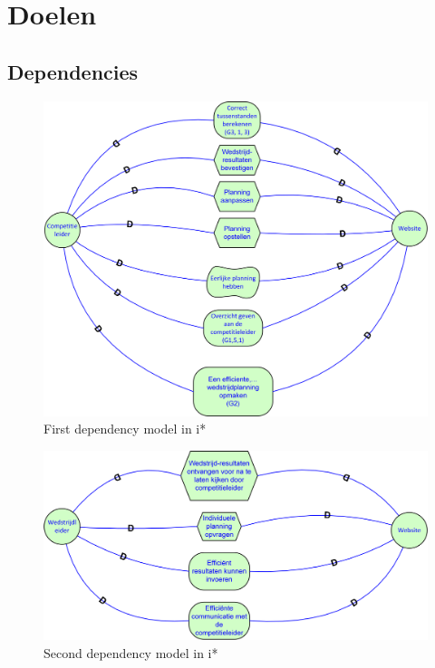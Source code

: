 \documentclass[12pt,a4paper]{article}
\begin{document}
		\section{Doelen}
			\subsection{Dependencies}
			\begin{figure}[H]
			\includegraphics[width=\textwidth]{../2-Doelen/istar1.png}
			\caption{First dependency model in i*}
			\end{figure}
			\begin{figure}[H]
				\includegraphics[width=\textwidth]{../2-Doelen/istar2.png}
				\caption{Second dependency model in i*}
			\end{figure}
\end{document}
